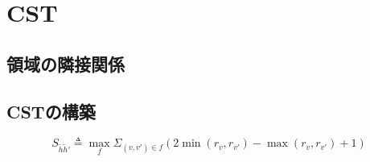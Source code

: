 \section{CST}

\subsection{領域の隣接関係}

\subsection{CSTの構築}

\begin{equation}
  S_{\widetilde{h}\widetilde{h}'} \triangleq \max_f \Sigma_{(v,v')\in f}(2\min(r_v,r_{v'})-\max(r_v,r_{v'})+1)
\end{equation}
